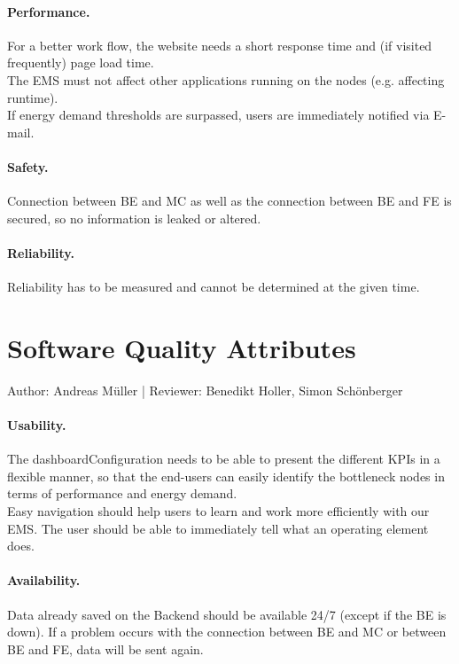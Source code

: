 \documentclass{scrreprt}
\begin{document}
\paragraph{Performance.}
For a better work flow, the website needs a short response time and (if visited frequently) page load time. \\
The EMS must not affect other applications running on the nodes (e.g. affecting runtime). \\ 
If energy demand thresholds are surpassed, users are immediately notified via E-mail.

\paragraph{Safety.}
Connection between BE and MC as well as the connection between BE and FE is secured, so no information is leaked or altered.

\paragraph{Reliability.}
Reliability has to be measured and cannot be determined at the given time.


\section{Software Quality Attributes}
Author: Andreas M\"uller |
Reviewer: Benedikt Holler, Simon Sch\"onberger 

\paragraph{Usability.}
The dashboardConfiguration needs to be able to present the different KPIs in a flexible manner, so that the end-users can easily identify the bottleneck nodes in terms of performance and energy demand. \\ Easy navigation should help users to learn and work more efficiently with our EMS. The user should be able to immediately tell what an operating element does.

\paragraph{Availability.}
Data already saved on the Backend should be available 24/7 (except if the
BE is down). If a problem occurs with the connection between BE and MC or between BE and FE, data will be sent again.
\end{document}
